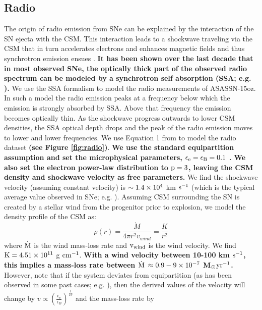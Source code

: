 \documentclass[a4paper,fleqn,usenatbib]{mnras}
\newcommand{\msunperiod}{M$\rm{_{\odot}}$}
\begin{document}
\subsection{Radio}\label{sec:RadioInteraction}
The origin of radio emission from SNe can be explained by the interaction of the SN ejecta with the CSM. 
This interaction leads to a shockwave traveling via the CSM that in turn accelerates electrons and enhances magnetic fields and thus synchrotron emission ensues \citep{1982chevalier,1998chevalier, 2002weiler, 2006chevalier}. 
\textbf{It has been shown over the last decade that in most observed SNe, the optically thick part of the observed radio spectrum can be modeled by a synchrotron self absorption (SSA; e.g. \citealt{2012soderberg, 2013horesh}).}
We use the \citet{1998chevalier} SSA formalism to model the radio measurements of ASASSN-15oz.
In such a model the radio emission peaks at a frequency below which the emission is strongly absorbed by SSA. 
Above that frequency the emission becomes optically thin. 
As the shockwave progress outwards to lower CSM densities, the SSA optical depth drops and the peak of the radio emission moves to lower and lower frequencies. 
We use Equation 1 from \citet{1998chevalier} to model the radio dataset \textbf{(see Figure \ref{fig:radio})}.
\textbf{We use the standard equipartition assumption and set the microphysical parameters, $\rm{\epsilon_{e} = \epsilon_{B}  = 0.1}$ \citep{2006chevalier}. 
We also set the electron power-law distribution to $\rm{p=3}$, leaving the CSM density and shockwave velocity as free parameters.}  
We find the shockwave velocity (assuming constant velocity) is $\rm{\sim 1.4\times10^{4}}$ km $\rm{s^{-1}}$ (which is the typical average value observed in SNe; e.g. \citealt{2006chevalier}).
Assuming CSM surrounding the SN is created by a stellar wind from the progenitor prior to explosion, we model the density profile of the CSM as:
\begin{equation} \label{eqn:density}
\rho(r) = \frac{\dot{M}}{4\pi r^{2}v_{wind}} = \frac{K}{r^{2}}
\end{equation}
where $\rm{\dot{M}}$ is the wind mass-loss rate and $\rm{v_{wind}}$ is the wind velocity.
We find $\rm{K = 4.51\times 10^{11}}$ g $\rm{cm^{-1}}$.
\textbf{With a wind velocity between 10-100 km $\rm{s^{-1}}$, this implies a mass-loss rate between $\rm{\dot{M}}$ $\rm{\approx 0.9-9\times 10^{-7}}$ \msunperiod $\rm{yr^{-1}}$.}
However, note that if the system deviates from equipartition (as has been observed in some past cases; e.g. \citealt{2012soderberg,2013horesh}), then the derived values of the velocity will change by $v \propto \left(\frac{\epsilon_{e}}{\epsilon_{B}}\right)^{\frac{1}{19}}$ and the mass-loss rate by 
\end{document}
